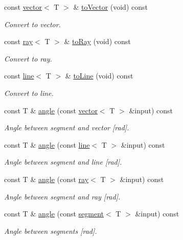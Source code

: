 \begin{DoxyCompactItemize}
const \hyperlink{classddd_1_1vector}{vector}$<$ T $>$ \& \hyperlink{classddd_1_1segment_ab49787592f80cedf871adf00d3e54f76}{to\+Vector} (void) const
\begin{DoxyCompactList}\small\item\em Convert to vector. \end{DoxyCompactList}\item 
\mbox{\label{classddd_1_1segment_a7d1f499833d4836df22ae38e0a08972e}} 
const \hyperlink{classddd_1_1ray}{ray}$<$ T $>$ \& \hyperlink{classddd_1_1segment_a7d1f499833d4836df22ae38e0a08972e}{to\+Ray} (void) const
\begin{DoxyCompactList}\small\item\em Convert to ray. \end{DoxyCompactList}\item 
\mbox{\label{classddd_1_1segment_aeac2e89c66a714d596695c17b4219491}} 
const \hyperlink{classddd_1_1line}{line}$<$ T $>$ \& \hyperlink{classddd_1_1segment_aeac2e89c66a714d596695c17b4219491}{to\+Line} (void) const
\begin{DoxyCompactList}\small\item\em Convert to line. \end{DoxyCompactList}\item 
const T \& \hyperlink{classddd_1_1segment_a87c35ebcb1818d0958e51868a60c4181}{angle} (const \hyperlink{classddd_1_1vector}{vector}$<$ T $>$ \&input) const
\begin{DoxyCompactList}\small\item\em Angle between segment and vector \mbox{[}rad\mbox{]}. \end{DoxyCompactList}\item 
const T \& \hyperlink{classddd_1_1segment_a63576e5f0bca9dc67f90a7b246345ff7}{angle} (const \hyperlink{classddd_1_1line}{line}$<$ T $>$ \&input) const
\begin{DoxyCompactList}\small\item\em Angle between segment and line \mbox{[}rad\mbox{]}. \end{DoxyCompactList}\item 
const T \& \hyperlink{classddd_1_1segment_a5c7ab773bb94ce6e8593a3517765efe2}{angle} (const \hyperlink{classddd_1_1ray}{ray}$<$ T $>$ \&input) const
\begin{DoxyCompactList}\small\item\em Angle between segment and ray \mbox{[}rad\mbox{]}. \end{DoxyCompactList}\item 
const T \& \hyperlink{classddd_1_1segment_a0b19e53d6aab0dc65290874e05fbb042}{angle} (const \hyperlink{classddd_1_1segment}{segment}$<$ T $>$ \&input) const
\begin{DoxyCompactList}\small\item\em Angle between segments \mbox{[}rad\mbox{]}. \end{DoxyCompactList}\end{DoxyCompactItemize}


